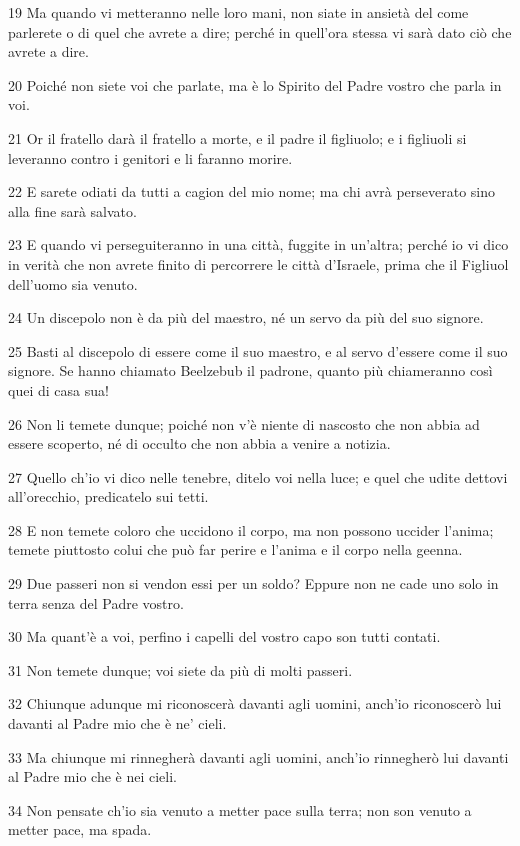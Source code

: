 \par 19 Ma quando vi metteranno nelle loro mani, non siate in ansietà del come parlerete o di quel che avrete a dire; perché in quell'ora stessa vi sarà dato ciò che avrete a dire.
\par 20 Poiché non siete voi che parlate, ma è lo Spirito del Padre vostro che parla in voi.
\par 21 Or il fratello darà il fratello a morte, e il padre il figliuolo; e i figliuoli si leveranno contro i genitori e li faranno morire.
\par 22 E sarete odiati da tutti a cagion del mio nome; ma chi avrà perseverato sino alla fine sarà salvato.
\par 23 E quando vi perseguiteranno in una città, fuggite in un'altra; perché io vi dico in verità che non avrete finito di percorrere le città d'Israele, prima che il Figliuol dell'uomo sia venuto.
\par 24 Un discepolo non è da più del maestro, né un servo da più del suo signore.
\par 25 Basti al discepolo di essere come il suo maestro, e al servo d'essere come il suo signore. Se hanno chiamato Beelzebub il padrone, quanto più chiameranno così quei di casa sua!
\par 26 Non li temete dunque; poiché non v'è niente di nascosto che non abbia ad essere scoperto, né di occulto che non abbia a venire a notizia.
\par 27 Quello ch'io vi dico nelle tenebre, ditelo voi nella luce; e quel che udite dettovi all'orecchio, predicatelo sui tetti.
\par 28 E non temete coloro che uccidono il corpo, ma non possono uccider l'anima; temete piuttosto colui che può far perire e l'anima e il corpo nella geenna.
\par 29 Due passeri non si vendon essi per un soldo? Eppure non ne cade uno solo in terra senza del Padre vostro.
\par 30 Ma quant'è a voi, perfino i capelli del vostro capo son tutti contati.
\par 31 Non temete dunque; voi siete da più di molti passeri.
\par 32 Chiunque adunque mi riconoscerà davanti agli uomini, anch'io riconoscerò lui davanti al Padre mio che è ne' cieli.
\par 33 Ma chiunque mi rinnegherà davanti agli uomini, anch'io rinnegherò lui davanti al Padre mio che è nei cieli.
\par 34 Non pensate ch'io sia venuto a metter pace sulla terra; non son venuto a metter pace, ma spada.
